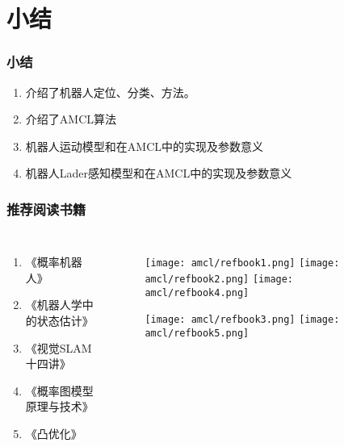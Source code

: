 \section{小结}

\begin{frame}
  \frametitle{小结}
  \begin{enumerate}
    \item 介绍了机器人定位、分类、方法。
    \item 介绍了AMCL算法
    \item 机器人运动模型和在AMCL中的实现及参数意义
    \item 机器人Lader感知模型和在AMCL中的实现及参数意义
  \end{enumerate}
  
\end{frame}

\begin{frame}
  \frametitle{推荐阅读书籍}
  \begin{columns}
    \begin{enumerate}
      \item 《概率机器人》
      \item 《机器人学中的状态估计》
      \item 《视觉SLAM十四讲》
      \item 《概率图模型原理与技术》
      \item 《凸优化》
    \end{enumerate}
    \begin{figure}
      \texttt{[image: amcl/refbook1.png]}
      \texttt{[image: amcl/refbook2.png]}
      \texttt{[image: amcl/refbook4.png]}

      \texttt{[image: amcl/refbook3.png]}
      \texttt{[image: amcl/refbook5.png]}
    \end{figure}
  \end{columns}

  
\end{frame}

    
